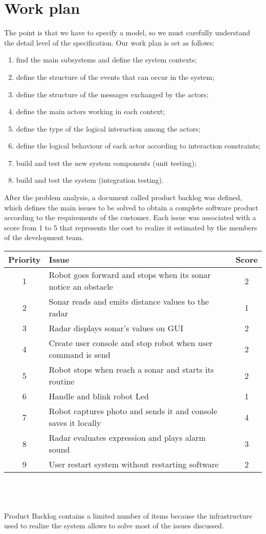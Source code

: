 \section{Work plan}
The point is that we have to specify a model, so we must carefully understand the detail level of the specification.
Our work plan is set as follows:
\begin{enumerate}
	\item find the main subsystems and define the system contexts;
	\item define the structure of the events that can occur in the system;
	\item define the structure of the messages exchanged by the actors;
	\item define the main actors working in each context;
	\item define the type of the logical interaction among the actors;
	\item define the logical behaviour of each actor according to interaction constraints;
	\item build and test the new system components (unit testing);
	\item build and test the system (integration testing).
\end{enumerate}
After the problem analysis, a document called product backlog was defined, which defines the main issues to be solved to obtain a complete software product according to the requirements of the customer. Each issue was associated with a score from 1 to 5 that represents the cost to realize it  estimated by the members of the development team.\\
\begin{minipage}{\linewidth}
\centering
{} \label{tab:title} 
\end{minipage}
\begin{tabular}{| c | p{9.5cm} | c |}
\hline
\textbf{Priority} & \textbf{Issue} &  \textbf{Score}\\ \hline
1 & Robot goes forward and stops when its sonar notice an obstacle & 2 \\  \hline
2 & Sonar reads and emits distance values to the radar & 1 \\  \hline
3 & Radar displays sonar's values on GUI & 2 \\  \hline
4 & Create user console and stop robot when user command is send & 2 \\ \hline
5 & Robot stops when reach a sonar and starts its routine & 2 \\  \hline
6 & Handle and blink robot Led &  1 \\ \hline
7 & Robot captures photo and sends it and console saves it locally & 4 \\ \hline
8 & Radar evaluates expression and plays alarm sound & 3 \\ \hline
9 & User restart system without restarting software & 2 \\
\hline
\end{tabular}
\\\\\\
Product Backlog contains a limited number of items because the infrastructure used to realize the system allows to solve most of the issues discussed.